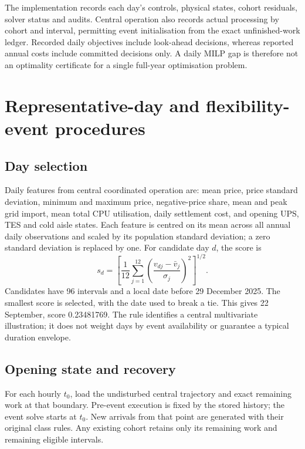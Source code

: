 The implementation records each day's controls, physical states, cohort residuals, solver status and audits. Central operation also records actual processing by cohort and interval, permitting event initialisation from the exact unfinished-work ledger. Recorded daily objectives include look-ahead decisions, whereas reported annual costs include committed decisions only. A daily MILP gap is therefore not an optimality certificate for a single full-year optimisation problem.

\section{Representative-day and flexibility-event procedures}
\subsection{Day selection}
Daily features from central coordinated operation are: mean price, price standard deviation, minimum and maximum price, negative-price share, mean and peak grid import, mean total CPU utilisation, daily settlement cost, and opening UPS, TES and \textcolor{LatestGreen}{cold aisle} states. Each feature is centred on its mean across all annual daily observations and scaled by its population standard deviation; a zero standard deviation is replaced by one. For candidate day $d$, the score is
\begin{equation}
s_d=\left[\frac{1}{12}\sum_{j=1}^{12}
\left(\frac{v_{dj}-\bar v_j}{\sigma_j}\right)^2\right]^{1/2}.
\end{equation}
Candidates have 96 intervals \textcolor{LatestGreen}{and a local date before} 29 December 2025. The smallest score is selected, \textcolor{LatestGreen}{with the date used to break a tie}. This gives 22 September, score 0.23481769. The rule identifies a central multivariate illustration; it does not weight days by \textcolor{LatestGreen}{event availability or guarantee} a typical duration envelope.

\subsection{Opening state and recovery}
For each hourly $t_0$, load the undisturbed central trajectory and exact remaining work at that boundary. Pre-event execution is fixed by the stored history; the event solve starts at $t_0$. New arrivals from that point are generated with their original class rules. Any existing cohort retains only its remaining work and remaining eligible intervals.

